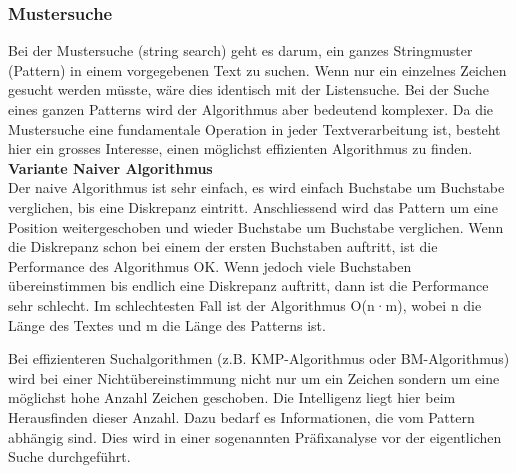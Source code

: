 \subsubsection{Mustersuche}
Bei der Mustersuche (string search) geht es darum, ein ganzes Stringmuster (Pattern) in einem vorgegebenen Text zu suchen. Wenn nur ein einzelnes Zeichen gesucht werden müsste, wäre dies identisch mit der Listensuche. Bei der Suche eines ganzen Patterns wird der Algorithmus aber bedeutend komplexer. Da die Mustersuche eine fundamentale Operation in jeder Textverarbeitung ist, besteht hier ein grosses Interesse, einen möglichst effizienten Algorithmus zu finden.\\

\textbf{Variante Naiver Algorithmus}\\
Der naive Algorithmus ist sehr einfach, es wird einfach Buchstabe um Buchstabe verglichen, bis eine Diskrepanz eintritt. Anschliessend wird das Pattern um eine Position weitergeschoben und wieder
Buchstabe um Buchstabe verglichen. Wenn die Diskrepanz schon bei einem der ersten Buchstaben auftritt, ist die Performance des Algorithmus OK. Wenn jedoch viele Buchstaben übereinstimmen bis endlich eine Diskrepanz auftritt, dann ist die Performance sehr schlecht. Im schlechtesten Fall ist der Algorithmus O(n·m), wobei n die Länge des Textes und m die Länge des Patterns ist.

Bei effizienteren Suchalgorithmen (z.B. KMP-Algorithmus oder BM-Algorithmus) wird bei einer Nichtübereinstimmung nicht nur um ein Zeichen sondern um eine möglichst hohe Anzahl Zeichen geschoben. Die Intelligenz liegt hier beim Herausfinden dieser Anzahl. Dazu bedarf es Informationen, die vom Pattern abhängig sind. Dies wird in einer sogenannten Präfixanalyse vor der eigentlichen Suche durchgeführt.


